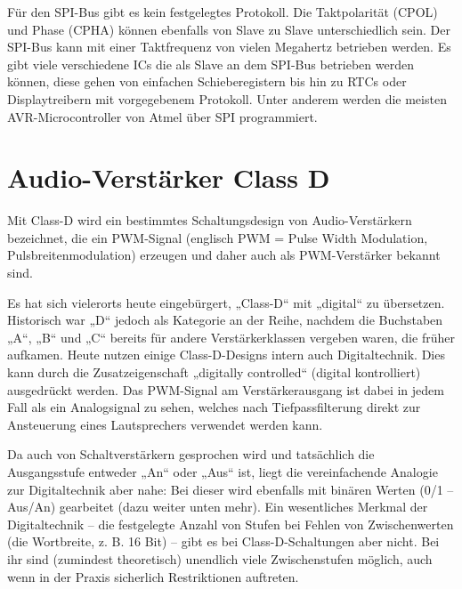 Für den SPI-Bus gibt es kein festgelegtes Protokoll. Die Taktpolarität (CPOL) und Phase (CPHA) können ebenfalls von Slave zu Slave unterschiedlich sein. Der SPI-Bus kann mit einer Taktfrequenz von vielen Megahertz betrieben werden. Es gibt viele verschiedene ICs die als Slave an dem SPI-Bus betrieben werden können, diese gehen von einfachen Schieberegistern bis hin zu RTCs oder Displaytreibern mit vorgegebenem Protokoll. Unter anderem werden die meisten AVR-Microcontroller von Atmel über SPI programmiert. \cite{mikrocontroller-spi}\par

\section{Audio-Verstärker Class D}
Mit Class-D wird ein bestimmtes Schaltungsdesign von Audio-Verstärkern bezeichnet, die ein PWM-Signal (englisch PWM = Pulse Width Modulation, Pulsbreitenmodulation) erzeugen und daher auch als PWM-Verstärker bekannt sind. \cite{fairaudio-classd}\par

Es hat sich vielerorts heute eingebürgert, „Class-D“ mit „digital“ zu übersetzen. Historisch war „D“ jedoch als Kategorie an der Reihe, nachdem die Buchstaben „A“, „B“ und „C“ bereits für andere Verstärkerklassen vergeben waren, die früher aufkamen. Heute nutzen einige Class-D-Designs intern auch Digitaltechnik. Dies kann durch die Zusatzeigenschaft „digitally controlled“ (digital kontrolliert) ausgedrückt werden. Das PWM-Signal am Verstärkerausgang ist dabei in jedem Fall als ein Analogsignal zu sehen, welches nach Tiefpassfilterung direkt zur Ansteuerung eines Lautsprechers verwendet werden kann. \cite{fairaudio-classd}\par

Da auch von Schaltverstärkern gesprochen wird und tatsächlich die Ausgangsstufe entweder „An“ oder „Aus“ ist, liegt die vereinfachende Analogie zur Digitaltechnik aber nahe: Bei dieser wird ebenfalls mit binären Werten (0/1 – Aus/An) gearbeitet (dazu weiter unten mehr). Ein wesentliches Merkmal der Digitaltechnik – die festgelegte Anzahl von Stufen bei Fehlen von Zwischenwerten (die Wortbreite, z. B. 16 Bit) – gibt es bei Class-D-Schaltungen aber nicht. Bei ihr sind (zumindest theoretisch) unendlich viele Zwischenstufen möglich, auch wenn in der Praxis sicherlich Restriktionen auftreten. \cite{fairaudio-classd}\par

